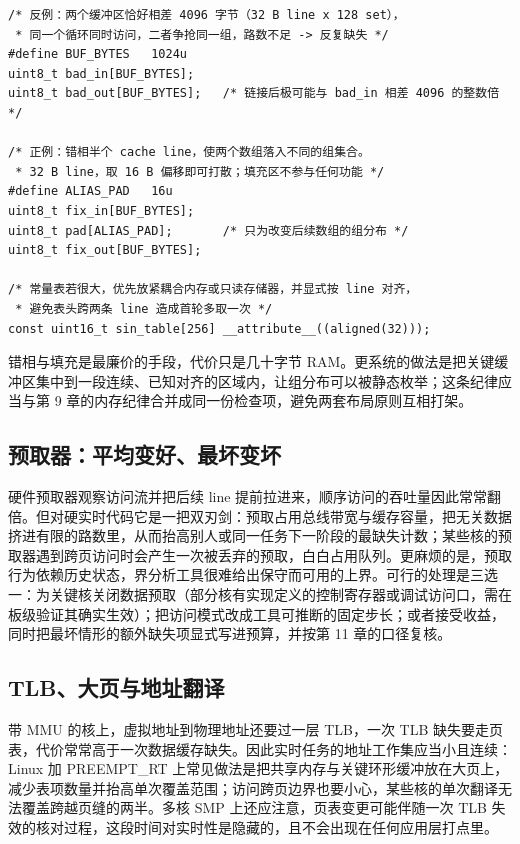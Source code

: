 \documentclass[12pt,a4paper,fontset=fandol]{ctexbook}
\begin{document}
\begin{lstlisting}[style=cstyle,caption={C：4 KB 间隔引起的组冲突，以及错相填充后的写法},label={lst:ch13-alias}]
/* 反例：两个缓冲区恰好相差 4096 字节（32 B line x 128 set），
 * 同一个循环同时访问，二者争抢同一组，路数不足 -> 反复缺失 */
#define BUF_BYTES   1024u
uint8_t bad_in[BUF_BYTES];
uint8_t bad_out[BUF_BYTES];   /* 链接后极可能与 bad_in 相差 4096 的整数倍 */

/* 正例：错相半个 cache line，使两个数组落入不同的组集合。
 * 32 B line，取 16 B 偏移即可打散；填充区不参与任何功能 */
#define ALIAS_PAD   16u
uint8_t fix_in[BUF_BYTES];
uint8_t pad[ALIAS_PAD];       /* 只为改变后续数组的组分布 */
uint8_t fix_out[BUF_BYTES];

/* 常量表若很大，优先放紧耦合内存或只读存储器，并显式按 line 对齐，
 * 避免表头跨两条 line 造成首轮多取一次 */
const uint16_t sin_table[256] __attribute__((aligned(32)));
\end{lstlisting}

错相与填充是最廉价的手段，代价只是几十字节 RAM。更系统的做法是把关键缓冲区集中到一段连续、已知对齐的区域内，让组分布可以被静态枚举；这条纪律应当与第 9 章的内存纪律合并成同一份检查项，避免两套布局原则互相打架。

\subsection{预取器：平均变好、最坏变坏}

硬件预取器观察访问流并把后续 line 提前拉进来，顺序访问的吞吐量因此常常翻倍。但对硬实时代码它是一把双刃剑：预取占用总线带宽与缓存容量，把无关数据挤进有限的路数里，从而抬高别人或同一任务下一阶段的最缺失计数；某些核的预取器遇到跨页访问时会产生一次被丢弃的预取，白白占用队列。更麻烦的是，预取行为依赖历史状态，界分析工具很难给出保守而可用的上界。可行的处理是三选一：为关键核关闭数据预取（部分核有实现定义的控制寄存器或调试访问口，需在板级验证其确实生效）；把访问模式改成工具可推断的固定步长；或者接受收益，同时把最坏情形的额外缺失项显式写进预算，并按第 11 章的口径复核。

\subsection{TLB、大页与地址翻译}

带 MMU 的核上，虚拟地址到物理地址还要过一层 TLB，一次 TLB 缺失要走页表，代价常常高于一次数据缓存缺失。因此实时任务的地址工作集应当小且连续：Linux 加 PREEMPT\_RT 上常见做法是把共享内存与关键环形缓冲放在大页上，减少表项数量并抬高单次覆盖范围；访问跨页边界也要小心，某些核的单次翻译无法覆盖跨越页缝的两半。多核 SMP 上还应注意，页表变更可能伴随一次 TLB 失效的核对过程，这段时间对实时性是隐藏的，且不会出现在任何应用层打点里。
\end{document}
